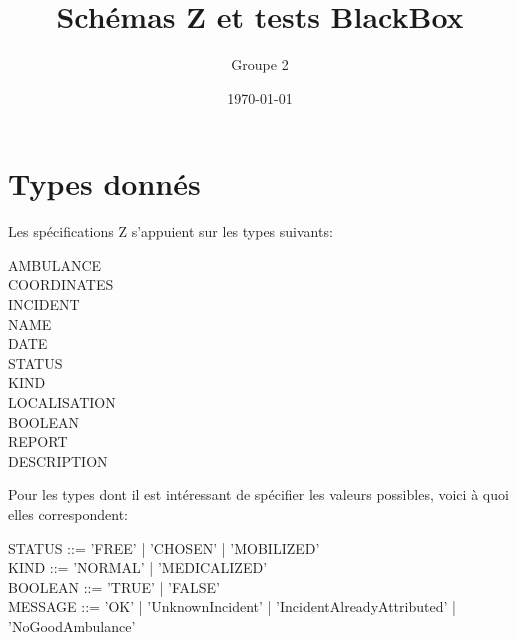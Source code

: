 \documentclass[12pt]{article}
\begin{document}
\title{Schémas Z et tests BlackBox}
\author{Groupe 2}
\date{\today}
\maketitle


\section{Types donnés}
Les spécifications Z s'appuient sur les types suivants:
\begin{zed}
AMBULANCE \\
COORDINATES \\
INCIDENT \\
NAME \\
DATE \\
STATUS  \\
KIND \\
LOCALISATION \\
BOOLEAN \\
REPORT  \\
DESCRIPTION
\end{zed}

Pour les types dont il est intéressant de spécifier les valeurs possibles, voici à quoi elles correspondent:
\begin{syntax}
STATUS ::= 'FREE' | 'CHOSEN' | 'MOBILIZED' \\
KIND ::= 'NORMAL' | 'MEDICALIZED' \\
BOOLEAN ::= 'TRUE'  | 'FALSE' \\
MESSAGE ::= 'OK' | 'UnknownIncident' | 'IncidentAlreadyAttributed' | 'NoGoodAmbulance'
\end{syntax}
\end{document}
